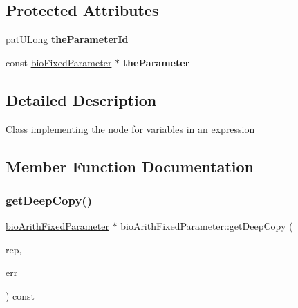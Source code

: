 \subsection*{Protected Attributes}
\begin{DoxyCompactItemize}
\item 
\mbox{\label{classbio_arith_fixed_parameter_a237d0536be87836417ca0c94db93a986}} 
pat\+U\+Long {\bfseries the\+Parameter\+Id}
\item 
\mbox{\label{classbio_arith_fixed_parameter_a22ef22b4b158871dc8f7cf6b3b5171de}} 
const \hyperlink{classbio_fixed_parameter}{bio\+Fixed\+Parameter} $\ast$ {\bfseries the\+Parameter}
\end{DoxyCompactItemize}


\subsection{Detailed Description}
Class implementing the node for variables in an expression 

\subsection{Member Function Documentation}
\mbox{\label{classbio_arith_fixed_parameter_a91c2dcaf2be8731defb45a02108b7b82}} 
\subsubsection{\texorpdfstring{get\+Deep\+Copy()}{getDeepCopy()}}
{\footnotesize\ttfamily \hyperlink{classbio_arith_fixed_parameter}{bio\+Arith\+Fixed\+Parameter} $\ast$ bio\+Arith\+Fixed\+Parameter\+::get\+Deep\+Copy (\begin{DoxyParamCaption}\item[{\hyperlink{classbio_expression_repository}{bio\+Expression\+Repository} $\ast$}]{rep,  }\item[{pat\+Error $\ast$\&}]{err }\end{DoxyParamCaption}) const\hspace{0.3cm}{\ttfamily [virtual]}}

